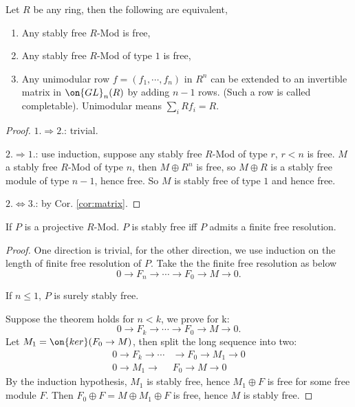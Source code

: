 \begin{thm}\label{thm:sf2cplt}
	Let $R$ be any ring, then the following are equivalent,
	\begin{enumerate}
		\item Any stably free $R$-Mod is free,
		\item Any stably free $R$-Mod of type $1$ is free,
		\item Any unimodular row $f=(f_1,\cdots,f_n)$ in $R^n$ can be extended to an invertible matrix in $\on{GL}_n(R)$ by adding $n-1$ rows. (Such a row is called completable). Unimodular means $\sum_iRf_i=R$.
	\end{enumerate}
\end{thm}
\begin{proof}
	$1.\Rightarrow 2.$: trivial.
	
	$2.\Rightarrow 1.$: use induction, suppose any stably free $R$-Mod of type $r$, $r<n$ is free. $M$ a stably free $R$-Mod of type $n$, then $M\oplus R^n$ is free, so $M\oplus R$ is a stably free module of type $n-1$, hence free. So $M$ is stably free of type $1$ and hence free.
	
	$2.\Leftrightarrow 3.$: by Cor. \ref{cor:matrix}.
\end{proof}

\begin{thm}\label{thm:sf&fr}
	If $P$ is a projective $R$-Mod. $P$ is stably free iff $P$ admits a finite free resolution.
\end{thm}
\begin{proof}
	One direction is trivial, for the other direction, we use induction on the length of finite free resolution of $P$. Take the the finite free resolution as below
	$$
	0\rightarrow F_n\rightarrow\cdots\rightarrow F_0\rightarrow M\rightarrow 0.
	$$
	
	If $n\leq 1$, $P$ is surely stably free.
	
	Suppose the theorem holds for $n<k$, we prove for k:
	$$
	0\rightarrow F_k\rightarrow\cdots\rightarrow F_0\rightarrow M\rightarrow 0.
	$$
	Let $M_1=\on{ker}(F_0\rightarrow M)$, then split the long sequence into two:
	\begin{align*}
		0\rightarrow F_k\rightarrow\cdots&\rightarrow F_0\rightarrow M_1\rightarrow 0\\
		0\rightarrow M_1\rightarrow&F_0\rightarrow M\rightarrow 0
	\end{align*}
	By the induction hypothesis, $M_1$ is stably free, hence $M_1\oplus F$ is free for some free module $F$. Then $F_0\oplus F=M\oplus M_1\oplus F$ is free, hence $M$ is stably free.
\end{proof}


